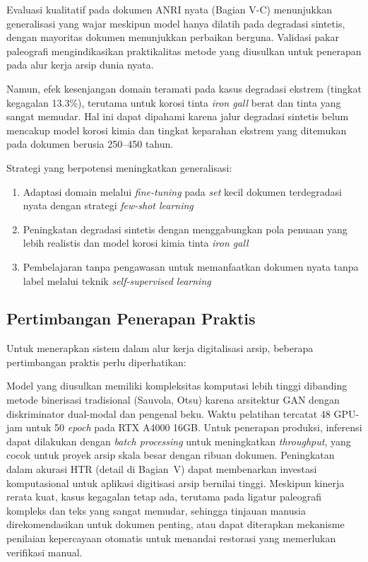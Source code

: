 \documentclass[journal]{IEEEtran}
\begin{document}
Evaluasi kualitatif pada dokumen ANRI nyata (Bagian V-C) menunjukkan generalisasi yang wajar meskipun model hanya dilatih pada degradasi sintetis, dengan mayoritas dokumen menunjukkan perbaikan berguna. Validasi pakar paleografi mengindikasikan praktikalitas metode yang diusulkan untuk penerapan pada alur kerja arsip dunia nyata.

Namun, efek kesenjangan domain teramati pada kasus degradasi ekstrem (tingkat kegagalan 13.3\%), terutama untuk korosi tinta \textit{iron gall} berat dan tinta yang sangat memudar. Hal ini dapat dipahami karena jalur degradasi sintetis belum mencakup model korosi kimia dan tingkat keparahan ekstrem yang ditemukan pada dokumen berusia 250--450 tahun.

Strategi yang berpotensi meningkatkan generalisasi:
\begin{enumerate}
    \item Adaptasi domain melalui \textit{fine-tuning} pada \textit{set} kecil dokumen terdegradasi nyata dengan strategi \textit{few-shot learning}
    \item Peningkatan degradasi sintetis dengan menggabungkan pola penuaan yang lebih realistis dan model korosi kimia tinta \textit{iron gall}
    \item Pembelajaran tanpa pengawasan untuk memanfaatkan dokumen nyata tanpa label melalui teknik \textit{self-supervised learning}
\end{enumerate}

\subsection{Pertimbangan Penerapan Praktis}

Untuk menerapkan sistem dalam alur kerja digitalisasi arsip, beberapa pertimbangan praktis perlu diperhatikan:

Model yang diusulkan memiliki kompleksitas komputasi lebih tinggi dibanding metode binerisasi tradisional (Sauvola, Otsu) karena arsitektur GAN dengan diskriminator dual-modal dan pengenal beku. Waktu pelatihan tercatat 48 GPU-jam untuk 50 \textit{epoch} pada RTX A4000 16GB. Untuk penerapan produksi, inferensi dapat dilakukan dengan \textit{batch processing} untuk meningkatkan \textit{throughput}, yang cocok untuk proyek arsip skala besar dengan ribuan dokumen. Peningkatan dalam akurasi HTR (detail di Bagian~V) dapat membenarkan investasi komputasional untuk aplikasi digitisasi arsip bernilai tinggi. Meskipun kinerja rerata kuat, kasus kegagalan tetap ada, terutama pada ligatur paleografi kompleks dan teks yang sangat memudar, sehingga tinjauan manusia direkomendasikan untuk dokumen penting, atau dapat diterapkan mekanisme penilaian kepercayaan otomatis untuk menandai restorasi yang memerlukan verifikasi manual.
\end{document}
